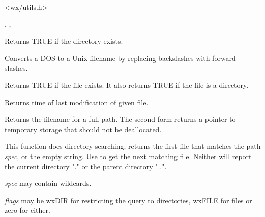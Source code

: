
<wx/utils.h>


, , 



Returns TRUE if the directory exists.



Converts a DOS to a Unix filename by replacing backslashes with forward
slashes.



Returns TRUE if the file exists. It also returns TRUE if the file is
a directory.

\label{wxfilemodificationtime}


Returns time of last modification of given file.




Returns the filename for a full path. The second form returns a pointer to
temporary storage that should not be deallocated.

\label{wxfindfirstfile}


This function does directory searching; returns the first file
that matches the path {\it spec}, or the empty string. Use  to
get the next matching file. Neither will report the current directory "." or the
parent directory "..".

{\it spec} may contain wildcards.

{\it flags} may be wxDIR for restricting the query to directories, wxFILE for files or zero for either.

